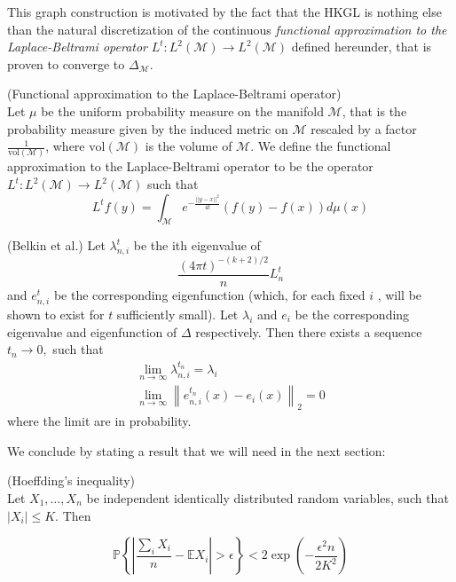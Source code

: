 This graph construction is motivated by the fact that the HKGL is nothing else than the natural discretization of the continuous \textit{functional approximation to the Laplace-Beltrami operator} $L^t:  L^{2}(\mathcal{M}) \rightarrow L^{2}(\mathcal{M})$ defined hereunder, that is proven to converge to $\Delta_\mathcal M$.

\vspace{0.5cm}
\begin{definition}{}(Functional approximation to the Laplace-Beltrami operator)\\ \label{eq: my L^t} Let $\mu$ be the uniform probability measure on the manifold $\mathcal M$, that is the probability measure given by the induced metric on $\mathcal M$ rescaled by a factor $\frac{1}{\text{vol}(\mathcal M)}$, where $\text{vol}(\mathcal M)$ is the volume of $\mathcal M$. We define the functional approximation to the Laplace-Beltrami operator to be the operator $L^t: L^{2}(\mathcal{M}) \rightarrow L^{2}(\mathcal{M})$ such that
	\label{def:Functional approximation to the Laplace-Beltrami operator}
	$$ L^tf(y) = \int_{\mathcal M}e^{-\frac{||y-x||^2}{4t}}\left(f(y)-f(x)\right)d\mu(x)$$
\end{definition}
\vspace{0.5cm}



\begin{theorem}(Belkin et al.)
	 Let \(\lambda_{n, i}^{t}\) be the ith eigenvalue of 
	 $$
	 \frac{(4\pi t)^{-(k+2)/2}}{n}L^t_n
	 $$
	 and \(e_{n, i}^{t}\) be the corresponding eigenfunction (which, for each fixed \(i\) , will be shown to exist for \(t\) sufficiently small). Let \(\lambda_{i}\) and \(e_{i}\) be the corresponding eigenvalue and eigenfunction of \(\Delta\) respectively. Then there exists a sequence \(t_{n} \rightarrow 0,\) such that
	\begin{equation}
	\begin{array}{c}{\lim _{n \rightarrow \infty} \lambda_{n, i}^{t_{n}}=\lambda_{i}} \\ {\lim _{n \rightarrow \infty}\left\|e_{n, i}^{t_{n}}(x)-e_{i}(x)\right\|_{2}=0}\end{array}
	\end{equation}
	where the limit are in probability.
\end{theorem}









We conclude by stating a result that we will need in the next section:
\vspace{0.5cm}
\begin{prop}(Hoeffding's inequality)\\
	Let \(X_{1}, \ldots, X_{n}\) be independent identically distributed random variables, such that
	\(\left|X_{i}\right| \leqslant K .\) Then
	
	$$
	\mathbb P\left\{\left|\frac{\sum_{i} X_{i}}{n}-\mathbb{E} X_{i}\right|>\epsilon\right\}<2 \exp \left(-\frac{\epsilon^{2} n}{2 K^{2}}\right)
	$$
	\label{theo:Hoeffding}
\end{prop}
